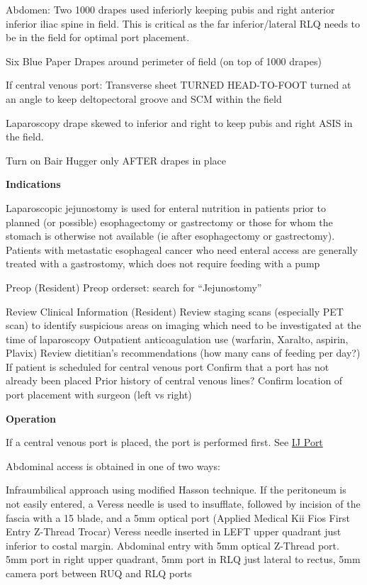 \documentclass[
]{book}
\begin{document}
Abdomen: Two 1000 drapes used inferiorly keeping pubis and right anterior inferior iliac spine in field. This is critical as the far inferior/lateral RLQ needs to be in the field for optimal port placement.

Six Blue Paper Drapes around perimeter of field (on top of 1000 drapes)

If central venous port: Transverse sheet TURNED HEAD-TO-FOOT turned at an angle to keep deltopectoral groove and SCM within the field

Laparoscopy drape skewed to inferior and right to keep pubis and right ASIS in the field.

Turn on Bair Hugger only AFTER drapes in place

\textbf{Indications}

Laparoscopic jejunostomy is used for enteral nutrition in patients prior to planned (or possible) esophagectomy or gastrectomy or those for whom the stomach is otherwise not available (ie after esophagectomy or gastrectomy). Patients with metastatic esophageal cancer who need enteral access are generally treated with a gastrostomy, which does not require feeding with a pump

Preop (Resident)
Preop orderset: search for ``Jejunostomy''

Review Clinical Information (Resident)
Review staging scans (especially PET scan) to identify suspicious areas on imaging which need to be investigated at the time of laparoscopy
Outpatient anticoagulation use (warfarin, Xaralto, aspirin, Plavix)
Review dietitian's recommendations (how many cans of feeding per day?)
If patient is scheduled for central venous port
Confirm that a port has not already been placed
Prior history of central venous lines?
Confirm location of port placement with surgeon (left vs right)

\textbf{Operation}

If a central venous port is placed, the port is performed first. See \protect\hyperlink{cv_port_salo}{IJ Port}

Abdominal access is obtained in one of two ways:

Infraumbilical approach using modified Hasson technique. If the peritoneum is not easily entered, a Veress needle is used to insufflate, followed by incision of the fascia with a 15 blade, and a 5mm optical port (Applied Medical Kii Fios First Entry Z-Thread Trocar)
Veress needle inserted in LEFT upper quadrant just inferior to costal margin. Abdominal entry with 5mm optical Z-Thread port.
5mm port in right upper quadrant, 5mm port in RLQ just lateral to rectus, 5mm camera port between RUQ and RLQ ports
\end{document}
